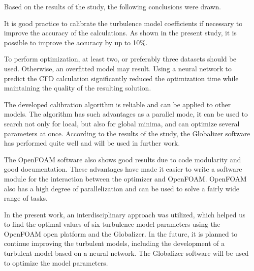 \documentclass[mathematics,article,accept,pdftex,moreauthors]{Definitions/mdpi}
\begin{document}
Based on the results of the study, the following conclusions were drawn.

It is good practice to calibrate the turbulence model coefficients if necessary to improve the accuracy of the calculations. As shown in the present study, it is possible to improve the accuracy by up to 10\%.

To perform optimization, at least two, or preferably three datasets should be used. Otherwise, an overfitted model may result.
Using a neural network to predict the CFD calculation significantly reduced the optimization time while maintaining the quality of the resulting solution.

 

The developed calibration algorithm is reliable and can be applied to other models. The algorithm has such advantages as a parallel mode, it can be used to search not only for local, but also for global minima, and can optimize several parameters at once. According to the results of the study, the Globalizer software has performed quite well and will be used in further work.

The OpenFOAM software also shows good results due to code modularity and good documentation. These advantages have made it easier to write a software module for the interaction between the optimizer and OpenFOAM. OpenFOAM also has a high degree of parallelization and can be used to solve a fairly wide range of tasks.

In the present work, an interdisciplinary approach was utilized, which helped us to find the optimal values of six turbulence model parameters using the OpenFOAM open platform and the Globalizer.  
In the future, it is planned to continue improving the turbulent models, including the development of a turbulent model based on a neural network. The Globalizer software will be used to optimize the model parameters.


\vspace{6pt} 

\end{document}
